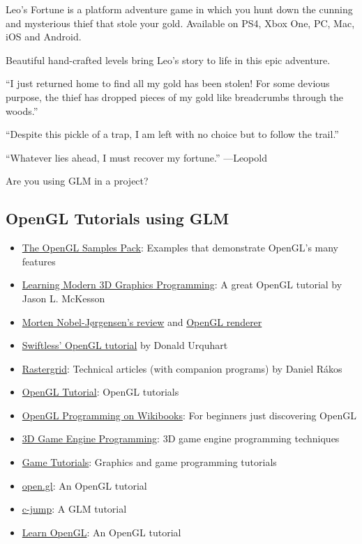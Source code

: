\documentclass{scrartcl}
\numberwithin{figure}{subsection}
\begin{document}
Leo's Fortune is a platform adventure game in which you hunt down the cunning and mysterious thief that stole your gold. Available on PS4, Xbox One, PC, Mac, iOS and Android.

Beautiful hand-crafted levels bring Leo's story to life in this epic adventure. 

\enquote{I just returned home to find all my gold has been stolen! For some devious purpose, the thief has dropped pieces of my gold like breadcrumbs through the woods.}

\enquote{Despite this pickle of a trap, I am left with no choice but to follow the trail.}

\enquote{Whatever lies ahead, I must recover my fortune.} ---Leopold

Are you using GLM in a project?  

\subsection{OpenGL Tutorials using GLM}

\begin{itemize}
  \item \href{http://www.g-truc.net/project-0026.html#menu}{The OpenGL Samples Pack}: Examples that demonstrate OpenGL's many features
  \item \href{http://www.arcsynthesis.org/gltut/}{Learning Modern 3D Graphics Programming}: A great OpenGL tutorial by Jason L. McKesson
  \item \href{http://blog.nobel-joergensen.com/2011/04/02/glm-brilliant-math-library-for-opengl/}{Morten Nobel-Jørgensen's review} and \href{https://github.com/mortennobel/RenderE}{OpenGL renderer} 
  \item \href{http://www.swiftless.com/opengltuts.html}{Swiftless' OpenGL tutorial} by Donald Urquhart
  \item \href{http://rastergrid.com/blog/}{Rastergrid}: Technical articles (with companion programs) by Daniel Rákos
  \item \href{http://www.opengl-tutorial.org}{OpenGL Tutorial}: OpenGL tutorials
  \item \href{http://en.wikibooks.org/wiki/OpenGL_Programming}{OpenGL Programming on Wikibooks}: For beginners just discovering OpenGL
  \item \href{http://3dgep.com/}{3D Game Engine Programming}: 3D game engine programming techniques
  \item \href{http://www.gametutorials.com/opengl-4-matrices-and-glm/}{Game Tutorials}: Graphics and game programming tutorials 
  \item \href{https://open.gl/}{open.gl}: An OpenGL tutorial
  \item \href{http://www.c-jump.com/bcc/common/Talk3/Math/GLM/GLM.html}{c-jump}: A GLM tutorial
  \item \href{http://learnopengl.com/}{Learn OpenGL}: An OpenGL tutorial
\end{itemize}
\end{document}

